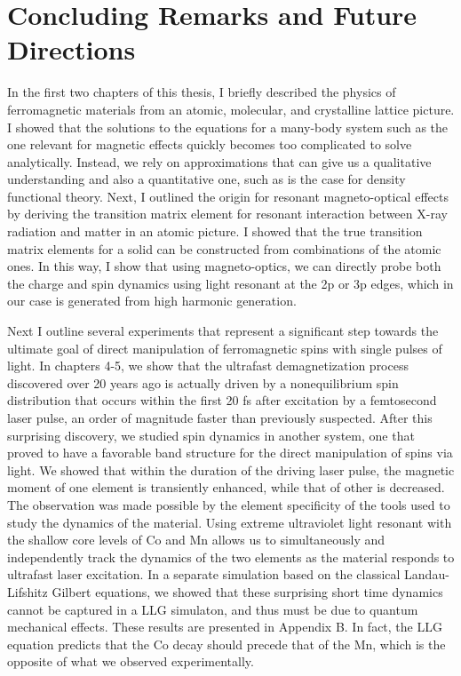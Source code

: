 \chapter{Concluding Remarks and Future Directions}

In the first two chapters of this thesis, I briefly described the physics of ferromagnetic materials from an atomic, molecular, and crystalline lattice picture. I showed that the solutions to the equations for a many-body system such as the one relevant for magnetic effects quickly becomes too complicated to solve analytically. Instead, we rely on approximations that can give us a qualitative understanding and also a quantitative one, such as is the case for density functional theory. Next, I outlined the origin for resonant magneto-optical effects by deriving the transition matrix element for resonant interaction between X-ray radiation and matter in an atomic picture. I showed that the true transition matrix elements for a solid can be constructed from combinations of the atomic ones. In this way, I show that using magneto-optics, we can directly probe both the charge and spin dynamics using light resonant at the 2p or 3p edges, which in our case is generated from high harmonic generation.

Next I outline several experiments that represent a significant step towards the ultimate goal of direct manipulation of ferromagnetic spins with single pulses of light. In chapters 4-5, we show that the ultrafast demagnetization process discovered over 20 years ago is actually driven by a nonequilibrium spin distribution that occurs within the first 20 fs after excitation by a femtosecond laser pulse, an order of magnitude faster than previously suspected. After this surprising discovery, we studied spin dynamics in another system, one that proved to have a favorable band structure for the direct manipulation of spins via light. We showed that within the duration of the driving laser pulse, the magnetic moment of one element is transiently enhanced, while that of other is decreased. The observation was made possible by the element specificity of the tools used to study the dynamics of the material. Using extreme ultraviolet light resonant with the shallow core levels of Co and Mn allows us to simultaneously and independently track the dynamics of the two elements as the material responds to ultrafast laser excitation. In a separate simulation based on the classical Landau-Lifshitz Gilbert equations, we showed that these surprising short time dynamics cannot be captured in a LLG simulaton, and thus must be due to quantum mechanical effects. These results are presented in Appendix B. In fact, the LLG equation predicts that the Co decay should precede that of the Mn, which is the opposite of what we observed experimentally.

